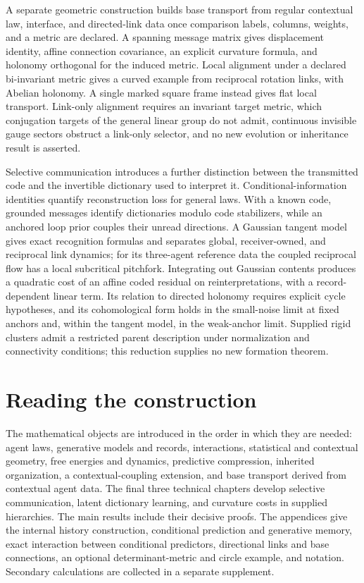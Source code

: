 A separate geometric construction builds base transport from regular contextual law, interface, and directed-link data once comparison labels, columns, weights, and a metric are declared. A spanning message matrix gives displacement identity, affine connection covariance, an explicit curvature formula, and holonomy orthogonal for the induced metric. Local alignment under a declared bi-invariant metric gives a curved example from reciprocal rotation links, with Abelian holonomy. A single marked square frame instead gives flat local transport. Link-only alignment requires an invariant target metric, which conjugation targets of the general linear group do not admit, continuous invisible gauge sectors obstruct a link-only selector, and no new evolution or inheritance result is asserted.

Selective communication introduces a further distinction between the transmitted code and the invertible dictionary used to interpret it. Conditional-information identities quantify reconstruction loss for general laws. With a known code, grounded messages identify dictionaries modulo code stabilizers, while an anchored loop prior couples their unread directions. A Gaussian tangent model gives exact recognition formulas and separates global, receiver-owned, and reciprocal link dynamics; for its three-agent reference data the coupled reciprocal flow has a local subcritical pitchfork. Integrating out Gaussian contents produces a quadratic cost of an affine coded residual on reinterpretations, with a record-dependent linear term. Its relation to directed holonomy requires explicit cycle hypotheses, and its cohomological form holds in the small-noise limit at fixed anchors and, within the tangent model, in the weak-anchor limit. Supplied rigid clusters admit a restricted parent description under normalization and connectivity conditions; this reduction supplies no new formation theorem.

\section*{Reading the construction}
The mathematical objects are introduced in the order in which they are needed: agent laws, generative models and records, interactions, statistical and contextual geometry, free energies and dynamics, predictive compression, inherited organization, a contextual-coupling extension, and base transport derived from contextual agent data. The final three technical chapters develop selective communication, latent dictionary learning, and curvature costs in supplied hierarchies. The main results include their decisive proofs. The appendices give the internal history construction, conditional prediction and generative memory, exact interaction between conditional predictors, directional links and base connections, an optional determinant-metric and circle example, and notation. Secondary calculations are collected in a separate supplement.

